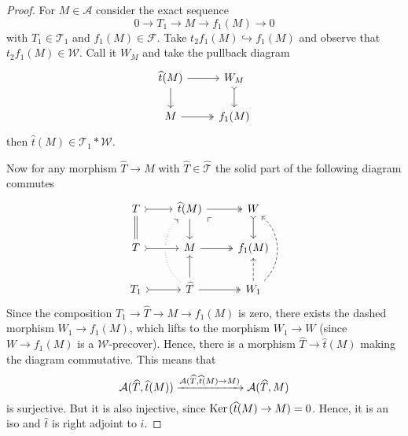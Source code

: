 \begin{proof}
  For $M\in\mathcal{A}$ consider the exact sequence
  \begin{equation*}
    0\rightarrow T_1\rightarrow M\rightarrow f_1(M) \rightarrow 0
  \end{equation*}
  with $T_1\in\mathcal{T}_1$ and $f_1(M)\in\mathcal{F}$. Take $t_2f_1(M)\hookrightarrow f_1(M)$ and observe
  that $t_2f_1(M)\in \mathcal{W}$. Call it $W_M$ and take the pullback diagram
  \begin{equation*}
    \begin{tikzcd}
      \widehat{t}(M)\arrow{r}\arrow{d}
        & W_M\arrow[tail]{d}\\
      M \arrow[two heads]{r}
        & f_1(M)
    \end{tikzcd}
  \end{equation*}
  then $\widehat{t}(M)\in\mathcal{T}_1\ast\mathcal{W}$.

  Now for any morphism $\widehat{T}\to M$ with $\widehat{T}\in\widehat{\mathcal{T}}$ the solid part
  of the following diagram commutes
  \begin{equation*}
    \begin{tikzcd}
      T\arrow[tail]{r}\arrow[equal]{d}
        & \widehat{t}(M)\arrow[two heads]{r}\arrow{d}\arrow[from=dd,bend left=50,dotted]
          \arrow[phantom,"\ulcorner",very near start]{dr}
          & W\arrow[tail]{d}\\
      T \arrow[tail,crossing over]{r}
        & M\arrow[two heads]{r}
          & f_1(M)\\
      T_1\arrow[tail]{r}
        & \widehat{T}\arrow[two heads]{r}\arrow{u}
          & W_1\arrow[dashed]{u}\arrow[bend right=50,dashed]{uu}
    \end{tikzcd}
  \end{equation*}
  Since the composition $T_1\to \widehat{T}\to M\to f_1(M)$ is zero, there exists the dashed
  morphism $W_1\to f_1(M)$, which lifts to the morphism $W_1\to W$ (since $W\to f_1(M)$ is a $\mathcal{W}$-precover).
  Hence, there is a morphism $\widehat{T}\to \widehat{t}(M)$ making the diagram commutative. This means that
  \begin{equation*}
    \mathcal{A}(\widehat{T},\widehat{t}(M))\xrightarrow{\mathcal{A}(\widehat{T},\widehat{t}(M)\to M)}
      \mathcal{A}(\widehat{T},M)
  \end{equation*}
  is surjective. But it is also injective, since $\mathrm{\textup{Ker\,}} (\widehat{t}(M)\to M)=0$. Hence, it is an iso and $\widehat{t}$ is
  right adjoint to $i$.
\end{proof}

